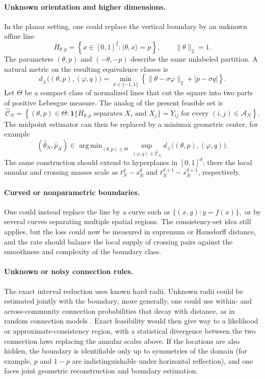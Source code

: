 \documentclass[ECP,preprint]{ejpecp} %
\DeclareMathOperator*{\argmin}{arg\,min}
\newcommand{\1}{\mathbf 1}
\newcommand{\cA}{\mathcal A}
\newcommand{\cC}{\mathcal C}
\begin{document}
\paragraph{Unknown orientation and higher dimensions.}
In the planar setting, one could replace the vertical boundary by an unknown affine line
\[
    H_{\theta,p}
    =
    \left\{
        x\in[0,1]^2:
        \langle\theta,x\rangle=p
    \right\},
    \qquad
    \|\theta\|_2=1.
\]
The parameters \((\theta,p)\) and \((-\theta,-p)\) describe the same unlabeled partition.  A natural metric on the resulting equivalence classes
is
\[
    d_\pm\bigl((\theta,p),(\varphi,q)\bigr)
    =
    \min_{\sigma\in\{-1,1\}}
    \left\{
        \|\theta-\sigma\varphi\|_2
        +
        |p-\sigma q|
    \right\}.
\]
Let \(\Theta\) be a compact class of normalized lines that cut the square into two parts of positive Lebesgue measure.  The analog of the present feasible set is
\[
    \widehat{\cC}_N
    =
    \left\{
        (\theta,p)\in\Theta:
        \1\{H_{\theta,p}\text{ separates }X_i\text{ and }X_j\}=Y_{ij}
        \text{ for every }(i,j)\in\cA_N
    \right\}.
\]
The midpoint estimator can then be replaced by a minimax geometric center,
for example
\[
    (\widehat\theta_N,\widehat p_N)
    \in
    \argmin_{(\theta,p)\in\Theta}
    \sup_{(\varphi,q)\in\widehat{\cC}_N}
    d_\pm\bigl((\theta,p),(\varphi,q)\bigr).
\]
The same construction should extend to hyperplanes in \([0,1]^d\); there the local annular and crossing masses scale as \(t_N^d-s_N^d\) and
\(t_N^{d+1}-s_N^{d+1}\), respectively.

\paragraph{Curved or nonparametric boundaries.}
One could instead replace the line by a curve such as
\(
    \{(x,y):y=f(x)\},
\)
or by several curves separating multiple spatial regions.  The consistency-set idea still applies, but the loss could now be measured in supremum or Hausdorff distance, and the rate should balance the local supply of crossing pairs against the smoothness and complexity of the boundary class.

\paragraph{Unknown or noisy connection rules.}
The exact interval reduction uses known hard radii.  Unknown radii could be estimated jointly with the boundary; more generally, one could use within- and across-community connection probabilities that decay with distance, as in random connection models \cite{meester1997random}.  Exact feasibility would then give way to a likelihood or approximate-consistency region, with a statistical divergence between the two connection laws replacing the annular scales above.  If the locations are also hidden, the boundary is identifiable only up to symmetries of the domain (for example, \(p\) and \(1-p\) are indistinguishable under horizontal reflection), and one faces joint geometric reconstruction and boundary estimation.
\end{document}
